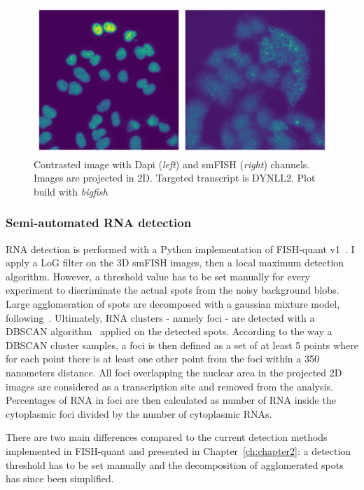 \begin{figure}[]
    \centering
    \includegraphics[width=\textwidth]{figures/chapter5/FoV_DYNLL2}
    \caption{Contrasted image with Dapi (\textit{left}) and smFISH (\textit{right}) channels.
	Images are projected in 2D.
	Targeted transcript is DYNLL2.
	Plot build with \emph{bigfish}}
    \label{fig:fov_racha}
\end{figure}

\subsubsection{Semi-automated RNA detection}

\ac{RNA} detection is performed with a Python implementation of FISH-quant v1~\cite{mueller_fish-quant_2013}.
I apply a \ac{LoG} filter on the 3D \ac{smFISH} images, then a local maximum detection algorithm.
However, a threshold value has to be set manually for every experiment to discriminate the actual spots from the noisy background blobs.
Large agglomeration of spots are decomposed with a gaussian mixture model, following~\cite{samacoits_computational_2018}.
Ultimately, \ac{RNA} clusters - namely foci - are detected with a DBSCAN algorithm~\cite{ester_density-based_1996} applied on the detected spots.
According to the way a DBSCAN cluster samples, a foci is then defined as a set of at least 5 points where for each point there is at least one other point from the foci within a 350 nanometers distance.
All foci overlapping the nuclear area in the projected 2D images are considered as a transcription site and removed from the analysis.
Percentages of \ac{RNA} in foci are then calculated as number of \ac{RNA} inside the cytoplasmic foci divided by the number of cytoplasmic \ac{RNA}s.

There are two main differences compared to the current detection methods implemented in FISH-quant and presented in Chapter~\ref{ch:chapter2}: a detection threshold has to be set manually and the decomposition of agglomerated spots has since been simplified.

